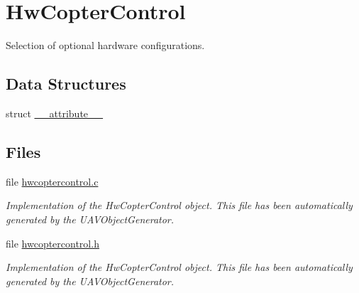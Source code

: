 \hypertarget{group___hw_copter_control}{\section{\-Hw\-Copter\-Control}
\label{group___hw_copter_control}
}


\-Selection of optional hardware configurations.  


\subsection*{\-Data \-Structures}
\begin{DoxyCompactItemize}
\item 
struct \hyperlink{struct____attribute____}{\-\_\-\-\_\-attribute\-\_\-\-\_\-}
\end{DoxyCompactItemize}
\subsection*{\-Files}
\begin{DoxyCompactItemize}
\item 
file \hyperlink{hwcoptercontrol_8c}{hwcoptercontrol.\-c}
\begin{DoxyCompactList}\small\item\em \-Implementation of the \-Hw\-Copter\-Control object. \-This file has been automatically generated by the \-U\-A\-V\-Object\-Generator. \end{DoxyCompactList}\item 
file \hyperlink{hwcoptercontrol_8h}{hwcoptercontrol.\-h}
\begin{DoxyCompactList}\small\item\em \-Implementation of the \-Hw\-Copter\-Control object. \-This file has been automatically generated by the \-U\-A\-V\-Object\-Generator. \end{DoxyCompactList}\end{DoxyCompactItemize}
